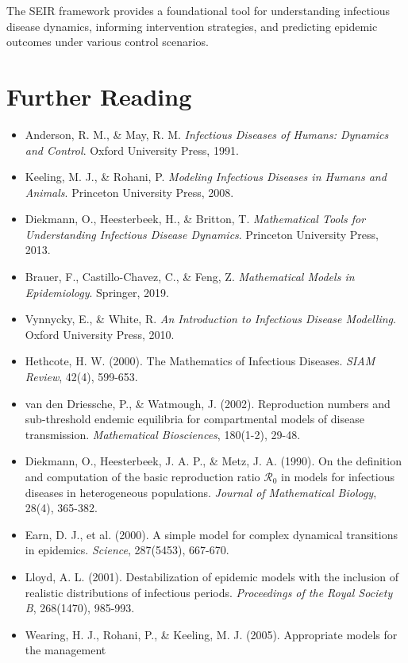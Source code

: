 \documentclass[a4paper, 11pt]{article}
\begin{document}
The SEIR framework provides a foundational tool for understanding infectious disease dynamics,
informing intervention strategies, and predicting epidemic outcomes under various control scenarios.

\section*{Further Reading}

\begin{itemize}
\item Anderson, R. M., \& May, R. M. \textit{Infectious Diseases of Humans: Dynamics and Control}.
Oxford University Press, 1991.
\item Keeling, M. J., \& Rohani, P. \textit{Modeling Infectious Diseases in Humans and Animals}.
Princeton University Press, 2008.
\item Diekmann, O., Heesterbeek, H., \& Britton, T. \textit{Mathematical Tools for Understanding
Infectious Disease Dynamics}. Princeton University Press, 2013.
\item Brauer, F., Castillo-Chavez, C., \& Feng, Z. \textit{Mathematical Models in Epidemiology}.
Springer, 2019.
\item Vynnycky, E., \& White, R. \textit{An Introduction to Infectious Disease Modelling}.
Oxford University Press, 2010.
\item Hethcote, H. W. (2000). The Mathematics of Infectious Diseases. \textit{SIAM Review},
42(4), 599-653.
\item van den Driessche, P., \& Watmough, J. (2002). Reproduction numbers and sub-threshold
endemic equilibria for compartmental models of disease transmission. \textit{Mathematical
Biosciences}, 180(1-2), 29-48.
\item Diekmann, O., Heesterbeek, J. A. P., \& Metz, J. A. (1990). On the definition and
computation of the basic reproduction ratio $\mathcal{R}_0$ in models for infectious diseases
in heterogeneous populations. \textit{Journal of Mathematical Biology}, 28(4), 365-382.
\item Earn, D. J., et al. (2000). A simple model for complex dynamical transitions in epidemics.
\textit{Science}, 287(5453), 667-670.
\item Lloyd, A. L. (2001). Destabilization of epidemic models with the inclusion of realistic
distributions of infectious periods. \textit{Proceedings of the Royal Society B}, 268(1470), 985-993.
\item Wearing, H. J., Rohani, P., \& Keeling, M. J. (2005). Appropriate models for the management

\end{itemize}
\end{document}
